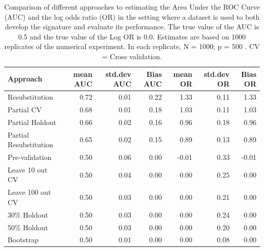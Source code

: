 \documentclass[11pt,]{article}
\begin{document}
\begin{table}

\caption{Comparison of different approaches to estimating the Area Under the ROC Curve (AUC) and the log odds ratio (OR) in the setting where a dataset is used to both develop the signature and evaluate its performance. The true value of the AUC is 0.5 and the true value of the Log OR is 0.0. Estimates are based on 1000 replicates of the numerical experiment. In each replicate,  N = 1000; p = 500 . CV = Cross validation. }
\centering
\begin{tabular}[t]{l|r|r|r|r|r|r}
\hline
Approach & mean AUC & std.dev AUC & Bias AUC & mean OR & std.dev OR & Bias OR\\
\hline
Resubstitution & 0.72 & 0.01 & 0.22 & 1.33 & 0.11 & 1.33\\
\hline
Partial CV & 0.68 & 0.01 & 0.18 & 1.03 & 0.11 & 1.03\\
\hline
Partial Holdout & 0.66 & 0.02 & 0.16 & 0.96 & 0.18 & 0.96\\
\hline
Partial Resubstitution & 0.65 & 0.02 & 0.15 & 0.89 & 0.13 & 0.89\\
\hline
Pre-validation & 0.50 & 0.06 & 0.00 & -0.01 & 0.33 & -0.01\\
\hline
Leave 10 out CV & 0.50 & 0.04 & 0.00 & 0.00 & 0.25 & 0.00\\
\hline
Leave 100 out CV & 0.50 & 0.03 & 0.00 & 0.00 & 0.21 & 0.00\\
\hline
30\% Holdout & 0.50 & 0.03 & 0.00 & 0.00 & 0.24 & 0.00\\
\hline
50\% Holdout & 0.50 & 0.03 & 0.00 & 0.00 & 0.20 & 0.00\\
\hline
Bootstrap & 0.50 & 0.01 & 0.00 & 0.00 & 0.08 & 0.00\\
\hline
\end{tabular}
\end{table}
\end{document}
